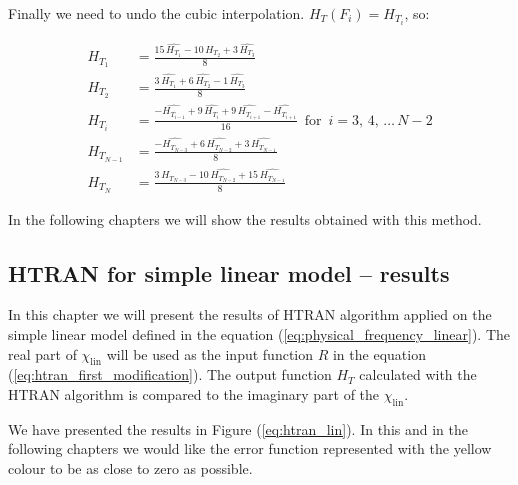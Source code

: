 \documentclass[12pt,twoside,a4paper]{article}
\numberwithin{equation}{subsection}
\numberwithin{figure}{subsection}
\begin{document}
Finally we need to undo the cubic interpolation. $ H_T(F_i) = H_{T_{i}} $, so: 

\begin{align}
  \label{eq:htundo_first}  
    H_{T_1}       & = \frac {15 \, \widehat{H_{T_1}} - 10 \, \widehat{H_{T_2}} + 3 \, \widehat{H_{T_3}}}{8} 
    \\
  \label{eq:htundo_second}
    H_{T_2}       & = \frac {3 \, \widehat{H_{T_1}} + 6 \, \widehat{H_{T_2}} - 1 \, \widehat{H_{T_3}}}{8} 
    \\ 
  \label{eq:htundo_next}
    H_{T_i}       & = \frac { - \widehat{H_{T_{i - 1}}} + 9 \, \widehat{H_{T_i}} + 9 \, \widehat{H_{T_{i + 1}}} - \widehat{ \mathit{H_{T_{i + 1}}}} }
                   {16} \, \mbox{ for } \, i = 3, \, 4, \, \ldots \, {N - 2} 
    \\ 
  \label{eq:htundo_prelast}
    H_{T_{N - 1}} & = \frac { - \widehat{H_{T_{N - 3}}} + 6 \, \widehat{H_{T_{N - 2}}} + 3 \, \widehat{H_{T_{N - 1}}}}{8} 
    \\
  \label{eq:htundo_last}
    H_{T_N}       & = \frac {3 \, \widehat{H_{T_{N - 3}}} - 10 \, \widehat{H_{T_{N - 2}}} + 15 \, \widehat{H_{T_{N - 1}}}}{8}  
\end{align}

In the following chapters we will show the results obtained with this method.

\subsection{HTRAN for simple linear model -- results} \label{chap:htran_lin}

In this chapter we will present the results of HTRAN algorithm applied on the simple linear model defined in the equation (\ref{eq:physical_frequency_linear}). The real part of $\chi_{\text{lin}}$ will be used as the input function $R$ in the equation (\ref{eq:htran_first_modification}). The output function $H_T$ calculated with the HTRAN algorithm is compared to the imaginary part of the $\chi_{\text{lin}}$. 

We have presented the results in Figure (\ref{eq:htran_lin}). In this and in the following chapters we would like the error function represented with the yellow colour to be as close to zero as possible. 
\end{document}
